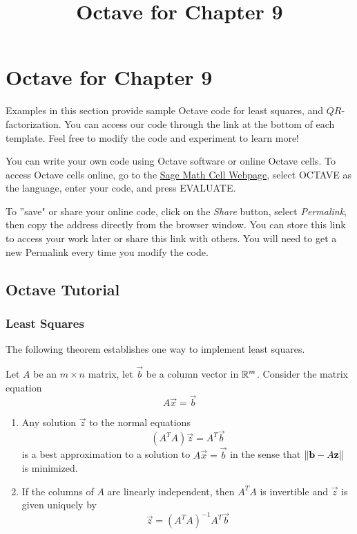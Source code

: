 \documentclass{ximera}
\title{Octave for Chapter 9} \license{CC BY-NC-SA 4.0}
\begin{document}
\begin{abstract}
\end{abstract}
\maketitle

\section*{Octave for Chapter 9}

Examples in this section provide sample Octave code for least squares, and $QR$-factorization. You can access our code through the link at the bottom of each template.  Feel free to modify the code and experiment to learn more!  

You can write your own code using Octave software or online Octave cells.  To access Octave cells online, go to the \href{https://sagecell.sagemath.org/}{Sage Math Cell Webpage}, select OCTAVE as the language, enter your code, and press EVALUATE.  

To ''save" or share your online code, click on the \emph{Share} button, select \emph{Permalink}, then copy the address directly from the browser window.  You can store this link to access your work later or share this link with others.  You will need to get a new Permalink every time you modify the code.

\subsection*{Octave Tutorial}
\subsubsection*{Least Squares}
The following theorem establishes one way to implement least squares.

\begin{theorem}[\ref{th:bestApprox}]
    Let $A$ be an $m\times n$ matrix, let $\vec{b}$ be a column vector in $\mathbb{R}^m$.  Consider the matrix equation
    $$A\vec{x}=\vec{b}$$
    \begin{enumerate}
        \item Any solution $\vec{z}$ to the normal equations
        $$\left(A^TA\right)\vec{z}=A^T\vec{b}$$
        is a best approximation to a solution to $A\vec{x}=\vec{b}$ in the sense that $\left\lVert\mathbf{b}-A\mathbf{z}\right\rVert$ is minimized.
        \item If the columns of $A$ are linearly independent, then $A^TA$ is invertible and $\vec{z}$ is given uniquely by
        $$\vec{z}=\left(A^TA\right)^{-1}A^T\vec{b}$$
    \end{enumerate}
    \end{theorem}
\end{document}
